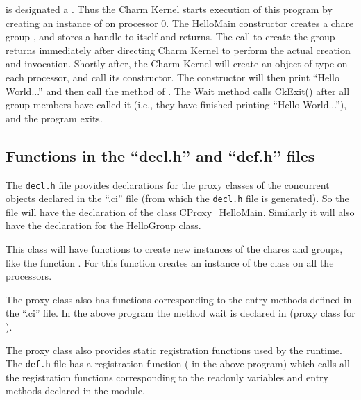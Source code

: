  is designated a . Thus the Charm Kernel starts
execution of this program by creating an instance of  on
processor 0. The HelloMain constructor creates a chare group ,
and stores a handle to itself and returns. The call to create the group returns
immediately after directing Charm Kernel to perform the actual creation and
invocation.  Shortly after, the Charm Kernel will create an object of type
 on each processor, and call its constructor. The constructor
will then print ``Hello World...'' and then call the  method of
. The Wait method calls CkExit() after all group members have
called it (i.e., they have finished printing ``Hello World...''), and the
\charmpp program exits.

\subsection{Functions in the ``decl.h'' and ``def.h'' files}

The \texttt{decl.h} file provides declarations for the proxy classes of the
concurrent objects declared in the ``.ci'' file (from which the \texttt{decl.h}
file is generated). So the  file will have the declaration of
the class CProxy\_HelloMain. Similarly it will also have the declaration for
the HelloGroup class. 

This class will have functions to create new instances of the chares and
groups, like the function . For  this function creates
an instance of the class  on all the processors. 

The proxy class also has functions corresponding to the entry methods defined
in the ``.ci'' file. In the above program the method wait is declared in
 (proxy class for ).

The proxy class also provides static registration functions used by the
\charmpp{} runtime.  The \texttt{def.h} file has a registration function
( in the above program) which calls all the registration
functions corresponding to the readonly variables and entry methods declared in
the module.

